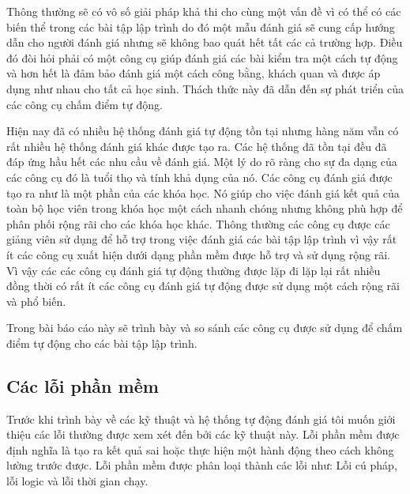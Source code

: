 \documentclass[12pt,a4paper]{article}
\begin{document}
\indent Thông thường sẽ có vô số giải pháp khả thi cho cùng một vấn đề vì có thể có các biến thể trong các bài tập lập trình do đó một mẫu đánh giá sẽ cung cấp hướng dẫn cho người đánh giá nhưng sẽ không bao quát hết tất các cả trường hợp. Điều đó đòi hỏi phải có một công cụ giúp đánh giá các bài kiểm tra một cách tự động và hơn hết là đảm bảo đánh giá một cách công bằng, khách quan và được áp dụng như nhau cho tất cả học sinh. Thách thức này đã dẫn đến sự phát triển của các công cụ chấm điểm tự động.

\indent Hiện nay đã có nhiều hệ thống đánh giá tự động tồn tại nhưng hàng năm vẫn có rất nhiều hệ thống đánh giá khác được tạo ra. Các hệ thống đã tồn tại đều đã đáp ứng hầu hết các nhu cầu về đánh giá. Một lý do rõ ràng cho sự đa dạng của các công cụ đó là tuổi thọ và tính khả dụng của nó. Các công cụ đánh giá được tạo ra như là một phần của các khóa học. Nó giúp cho việc đánh giá kết quả của toàn bộ học viên trong khóa học một cách nhanh chóng nhưng không phù hợp để phân phối rộng rãi cho các khóa học khác. Thông thường các công cụ được các giảng viên sử dụng để hỗ trợ trong việc đánh giá các bài tập lập trình vì vậy rất ít các công cụ xuất hiện dưới dạng phần mềm được hỗ trợ và sử dụng rộng rãi. Vì vậy các các công cụ đánh giá tự động thường được lặp đi lặp lại rất nhiều đồng thời có rất ít các công cụ đánh giá tự động được sử dụng một cách rộng rãi và phổ biến.

\indent  Trong bài báo cáo này sẽ trình bày và so sánh các công cụ được sử dụng để chấm điểm tự động cho các bài tập lập trình.

\subsection{Các lỗi phần mềm}
Trước khi trình bày về các kỹ thuật và hệ thống tự động đánh giá tôi muốn giới thiệu các lỗi thường được xem xét đến bởi các kỹ thuật này. Lỗi phần mềm được định nghĩa là tạo ra kết quả sai hoặc thực hiện một hành động theo cách không lường trước được. Lỗi phần mềm được phân loại thành các lỗi như: Lỗi cú pháp, lỗi logic và lỗi thời gian chạy.
\end{document}
